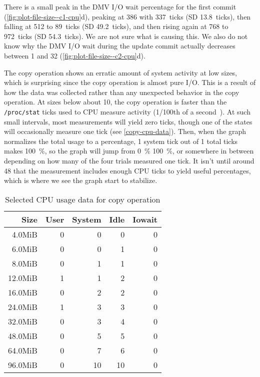 There is a small peak in the DMV I/O wait percentage for the first commit
(\autoref{fig:plot-file-size--c1-cpu}d), peaking at \SI{386}{\mib} with
\SI{337}{ticks} (SD \SI{13.8}{ticks}), then falling at \SI{512}{\mib} to
\SI{89}{ticks} (SD \SI{49.2}{ticks}), and then rising again at \SI{768}{\mib} to
\SI{972}{ticks} (SD \SI{54.3}{ticks}). We are not sure what is causing this. We
also do not know why the DMV I/O wait during the update commit actually
decreases between \SI{1}{\gib} and \SI{32}{\gib}
(\autoref{fig:plot-file-size--c2-cpu}d).


The copy operation shows an erratic amount of system activity at low sizes,
which is surprising since the copy operation is almost pure I/O. This is a
result of how the data was collected rather than any unexpected behavior in the
copy operation. At sizes below about \SI{10}{\mib}, the copy operation is faster
than the \lstinline{/proc/stat} ticks used to CPU measure activity
(\num{1/100}{th} of a second~\cite{proc_man_page}). At such small intervals, most
measurements will yield zero ticks, though one of the states will occasionally
measure one tick (see \autoref{copy-cpu-data}). Then, when the graph normalizes
the total usage to a percentage, \num{1} system tick out of \num{1} total ticks
makes \SI{100}{\percent}, so the graph will jump from \SI{0}{\percent}
\SI{100}{\percent}, or somewhere in between depending on how many of the four
trials measured one tick. It isn't until around \SI{48}{\mib} that the
measurement includes enough CPU ticks to yield useful percentages, which is
where we see the graph start to stabilize.


\begin{table}[hp]
    \caption{Selected CPU usage data for copy operation}
    \label{copy-cpu-data}

    \centering
    \begin{tabular}{r r r r r}
        Size & User & System & Idle & Iowait \\
        \midrule
  4.0MiB &    0    &      0    &      0    &      0 \\
  6.0MiB &    0    &      0    &      1    &      0 \\
  8.0MiB &    0    &      1    &      1    &      0 \\
 12.0MiB &    1    &      1    &      2    &      0 \\
 16.0MiB &    0    &      2    &      2    &      0 \\
 24.0MiB &    1    &      3    &      3    &      0 \\
 32.0MiB &    0    &      3    &      4    &      0 \\
 48.0MiB &    0    &      5    &      5    &      0 \\
 64.0MiB &    0    &      7    &      6    &      0 \\
 96.0MiB &    0    &     10    &     10    &      0 \\
    \end{tabular}
\end{table}

